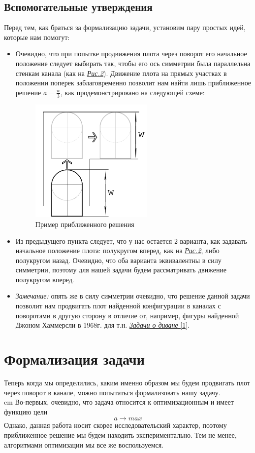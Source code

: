\documentclass[12pt,a4paper]{article}
\begin{document}
		\subsection{Вспомогательные утверждения}
			Перед тем, как браться за формализацию задачи, установим пару простых идей, которые нам помогут:
			\begin{itemize}
				\item Очевидно, что при попытке продвижения плота через поворот его начальное положение следует выбирать так, чтобы его ось симметрии была параллельна стенкам канала (как на \hyperref[fig:scheme]{\textit{Рис.2}}). Движение плота на прямых участках в положении поперек заблаговременно позволит нам найти лишь приближенное решение $a = \frac{w}{3}$, как продемонстрировано на следующей схеме:
				\begin{figure}[H]\label{fig:example}
					\centering
					\includegraphics[width=6cm]{res/example.png}
					\caption{Пример приближенного решения}
				\end{figure}
				
				\item Из предыдущего пункта следует, что у нас остается 2 варианта, как задавать начальное положение плота: полукругом вперед, как на \hyperref[fig:scheme]{\textit{Рис.2}}, либо полукругом назад. Очевидно, что оба варианта эквивалентны в силу симметрии, поэтому для нашей задачи будем рассматривать движение полукругом вперед.
				
				\item \textit{Замечание:} опять же в силу симметрии очевидно, что решение данной задачи позволит нам продвигать плот найденной конфигурации в каналах с поворотами в другую сторону в отличие от, например, фигуры найденной Джоном Хаммерсли в 1968г. для т.н. \hyperref[1]{\textit{Задачи о диване} [1]}.
			\end{itemize}
		
	\section{Формализация задачи}
		Теперь когда мы определились, каким именно образом мы будем продвигать плот через поворот в канале, можно попытаться формализовать нашу задачу.\\
		 cm
		Во-первых, очевидно, что задача относится к оптимизационным и имеет функцию цели
		\begin{equation}
			a \longrightarrow max
		\end{equation}
		Однако, данная работа носит скорее исследовательский характер, поэтому приближенное решение мы будем находить экспериментально. Тем не менее, алгоритмами оптимизации мы все же воспользуемся.
		
\end{document}
